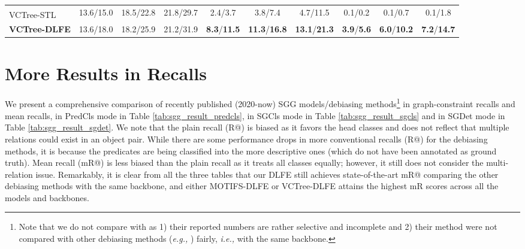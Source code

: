 \documentclass[sigconf]{acmart}
\begin{document}
\begin{table*}[htbp]
{\begin{tabular}{l|c c c|c c c|c c c}
VCTree-STL\textsuperscript{} \cite{chen2019soft} & 13.6/15.0 & 18.5/22.8 & 21.8/29.7 & 2.4/3.7 & 3.8/7.4 & 4.7/11.5 & 0.1/0.2 & 0.1/0.7 & 0.1/1.8 \\
\textbf{VCTree-DLFE} & 13.6/18.0 & 18.2/25.9 & 21.2/31.9 & \textbf{8.3}/\textbf{11.5} & \textbf{11.3}/\textbf{16.8} & \textbf{13.1}/\textbf{21.3} & \textbf{3.9}/\textbf{5.6} & \textbf{6.0}/\textbf{10.2} & \textbf{7.2}/\textbf{14.7} \\
\hline
\end{tabular}
}
\vspace{0.1em}
\caption{Head, middle and tail (with/without graph constraint) recalls in the SGDet task on VG150.  and  are with the same meaning as in Table 1 of the main paper.
}
\label{tab:head_mid_tail_sgdet}
\end{table*}

\section{More Results in Recalls}
\label{sec:appendix_more_results_in_recalls}
We present a comprehensive comparison of recently published (2020-now) SGG models/debiasing methods\footnote{Note that we do not compare with \cite{knyazev2020graphdensity} as 1) their reported numbers are rather selective and incomplete and 2) their method were not compared with other debiasing methods (\emph{e.g.,} \cite{tang2020unbiased}) fairly, \emph{i.e.,} with the same backbone.} in graph-constraint recalls and mean recalls, in PredCls mode in Table \ref{tab:sgg_result_predcls}, in SGCls mode in Table \ref{tab:sgg_result_sgcls} and in SGDet mode in Table \ref{tab:sgg_result_sgdet}.
We note that the plain recall (R@) is biased as it favors the head classes and does not reflect that multiple relations could exist in an object pair. 
While there are some performance drops in more conventional recalls (R@) for the debiasing methods, it is because the predicates are being classified into the more descriptive ones (which do not have been annotated as ground truth).
Mean recall (mR@) is less biased than the plain recall as it treats all classes equally; however, it still does not consider the multi-relation issue.
Remarkably, it is clear from all the three tables that our DLFE still achieves state-of-the-art mR@ comparing the other debiasing methods with the same backbone, and either MOTIFS-DLFE or VCTree-DLFE attains the highest mR scores across all the models and backbones.
\end{document}
